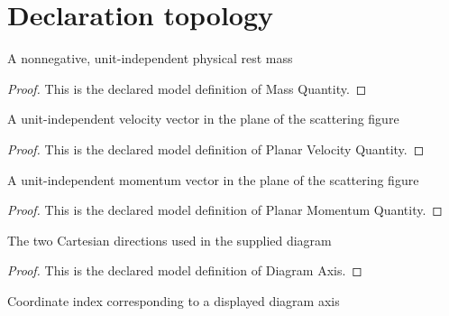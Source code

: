 \section{Declaration topology}
\begin{definition}
  \label{def:physics:phyx-mini-0641:phyxminiproblems-problemphyxmini0641-massquantity}
  A nonnegative, unit-independent physical rest mass
\end{definition}
\begin{proof}
  This is the declared model definition of Mass Quantity.
\end{proof}
\begin{definition}
  \label{def:physics:phyx-mini-0641:phyxminiproblems-problemphyxmini0641-planarvelocityquantity}
  A unit-independent velocity vector in the plane of the scattering figure
\end{definition}
\begin{proof}
  This is the declared model definition of Planar Velocity Quantity.
\end{proof}
\begin{definition}
  \label{def:physics:phyx-mini-0641:phyxminiproblems-problemphyxmini0641-planarmomentumquantity}
  A unit-independent momentum vector in the plane of the scattering figure
\end{definition}
\begin{proof}
  This is the declared model definition of Planar Momentum Quantity.
\end{proof}
\begin{definition}
  \label{def:physics:phyx-mini-0641:phyxminiproblems-problemphyxmini0641-diagramaxis}
  The two Cartesian directions used in the supplied diagram
\end{definition}
\begin{proof}
  This is the declared model definition of Diagram Axis.
\end{proof}
\begin{definition}[to Fin]
  \label{def:physics:phyx-mini-0641:phyxminiproblems-problemphyxmini0641-diagramaxis-tofin}
  Coordinate index corresponding to a displayed diagram axis
\end{definition}

